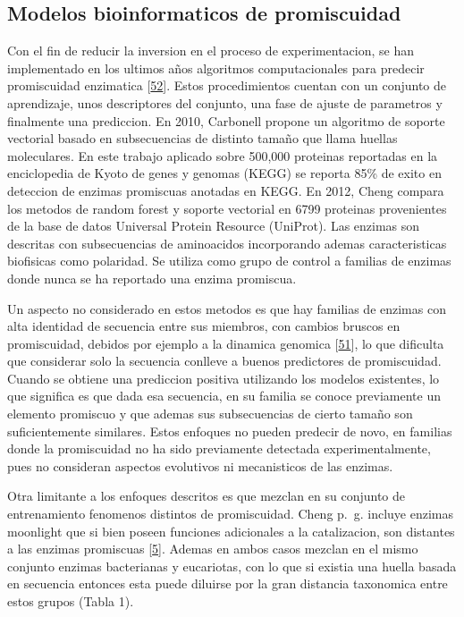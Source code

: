 \documentclass[12pt,twoside]{reedthesis}
\begin{document}
  \subsection{Modelos bioinformaticos de
  promiscuidad}\label{modelos-bioinformaticos-de-promiscuidad}
  
  Con el fin de reducir la inversion en el proceso de experimentacion, se
  han implementado en los ultimos años algoritmos computacionales para
  predecir promiscuidad enzimatica
  {[}\protect\hyperlink{ref-carbonellux5fmolecularux5f2010}{52}{]}. Estos
  procedimientos cuentan con un conjunto de aprendizaje, unos descriptores
  del conjunto, una fase de ajuste de parametros y finalmente una
  prediccion. En 2010, Carbonell propone un algoritmo de soporte vectorial
  basado en subsecuencias de distinto tamaño que llama huellas
  moleculares. En este trabajo aplicado sobre 500,000 proteinas reportadas
  en la enciclopedia de Kyoto de genes y genomas (KEGG) se reporta 85\% de
  exito en deteccion de enzimas promiscuas anotadas en KEGG. En 2012,
  Cheng compara los metodos de random forest y soporte vectorial en 6799
  proteinas provenientes de la base de datos Universal Protein Resource
  (UniProt). Las enzimas son descritas con subsecuencias de aminoacidos
  incorporando ademas caracteristicas biofisicas como polaridad. Se
  utiliza como grupo de control a familias de enzimas donde nunca se ha
  reportado una enzima promiscua.
  
  Un aspecto no considerado en estos metodos es que hay familias de
  enzimas con alta identidad de secuencia entre sus miembros, con cambios
  bruscos en promiscuidad, debidos por ejemplo a la dinamica genomica
  {[}\protect\hyperlink{ref-noda-garciaux5fevolutionux5f2013}{51}{]}, lo
  que dificulta que considerar solo la secuencia conlleve a buenos
  predictores de promiscuidad. Cuando se obtiene una prediccion positiva
  utilizando los modelos existentes, lo que significa es que dada esa
  secuencia, en su familia se conoce previamente un elemento promiscuo y
  que ademas sus subsecuencias de cierto tamaño son suficientemente
  similares. Estos enfoques no pueden predecir de novo, en familias donde
  la promiscuidad no ha sido previamente detectada experimentalmente, pues
  no consideran aspectos evolutivos ni mecanisticos de las enzimas.
  
  Otra limitante a los enfoques descritos es que mezclan en su conjunto de
  entrenamiento fenomenos distintos de promiscuidad. Cheng p.~g. incluye
  enzimas moonlight que si bien poseen funciones adicionales a la
  catalizacion, son distantes a las enzimas promiscuas
  {[}\protect\hyperlink{ref-copleyux5fenzymesux5f2003}{5}{]}. Ademas en
  ambos casos mezclan en el mismo conjunto enzimas bacterianas y
  eucariotas, con lo que si existia una huella basada en secuencia
  entonces esta puede diluirse por la gran distancia taxonomica entre
  estos grupos (Tabla 1).
  
\end{document}

